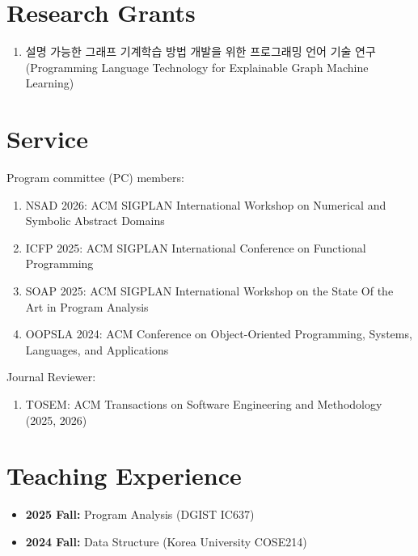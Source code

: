 \documentclass[letterpaper,11pt]{article}
\begin{document}



\section{Research Grants}
\begin{enumerate}
  \item{설명 가능한 그래프 기계학습 방법 개발을 위한 프로그래밍 언어 기술 연구 (Programming Language Technology for Explainable Graph Machine Learning)
}
\end{enumerate}

\section{Service}
Program committee (PC) members:
\begin{enumerate}
  \item{NSAD 2026: ACM SIGPLAN International Workshop on Numerical and Symbolic Abstract Domains}
  \item{ICFP 2025: ACM SIGPLAN International Conference on Functional Programming}
  \item{SOAP 2025: ACM SIGPLAN International Workshop on the State Of the Art in Program Analysis}
  \item{OOPSLA 2024: ACM Conference on Object-Oriented Programming, Systems, Languages, and Applications}
\end{enumerate}
Journal Reviewer:
\begin{enumerate}
\item{TOSEM: ACM Transactions on Software Engineering and Methodology (2025, 2026)}
\end{enumerate}


\section{Teaching Experience}
\begin{itemize}
  \item{{\bf 2025 Fall:} Program Analysis (DGIST IC637)}
  \item{{\bf 2024 Fall:} Data Structure (Korea University COSE214)}
\end{itemize}
\end{document}
